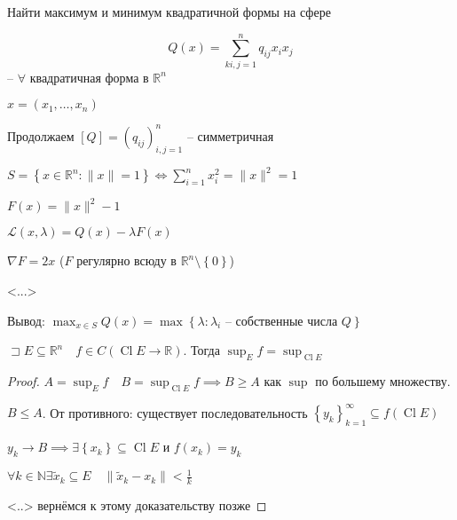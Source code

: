 \documentclass{book}
\newcommand\N{\ensuremath{\mathbb{N}}}
\newcommand\R{\ensuremath{\mathbb{R}}}
\newcommand{\tl}[1]{\widetilde{#1}}
\theoremstyle{definition}
\DeclareMathOperator{\Cl}{Cl}
\begin{document}
\begin{problem}
    Найти максимум и минимум квадратичной формы на сфере

    \[Q(x) = \sum_{ki,j=1}^{n} q_{ij}x_ix_j\] -- $\forall $ квадратичная форма в $\R^n$

    $x = \left( x_1, \ldots, x_{n}  \right) $

    Продолжаем $[Q] = \left( q_{ij} \right) ^n_{i,j=1}$ -- симметричная

    $S = \left\{ x\in \R^n:\|x\| = 1 \right\} \iff \sum_{i=1}^{n} x_i^2 = \|x\|^2 = 1 $ 

    $F(x) = \|x\|^2-1$

    $\mathcal L(x, \lambda) = Q(x) - \lambda F(x)$

    $\nabla F = 2x$ ($F$ регулярно всюду в  $\R^n\setminus \left\{ 0 \right\} $)

    <...>

    Вывод: $\max_{x\in S}Q(x) = \max \left\{ \lambda: \lambda_i \text{ -- собственные числа } Q \right\} $ 


\end{problem}
$\sqsupset E\subseteq \R^n \quad f\in C\left( \Cl E \to  \R \right)  $. Тогда $\sup_E f = \sup _{\Cl E}$
\begin{proof}
    $A = \sup _Ef\quad B = \sup_{\Cl E}f \implies B\geqslant A$ как $\sup$ по большему множеству.

    $B\leqslant A$. От противного: существует последовательность $\left\{ y_k \right\} _{k=1}^{\infty } \subseteq f\left( \Cl E \right) $ 

    $y_k\to B \implies \exists \left\{ x_k \right\} \subseteq \Cl E$ и $f(x_k) = y_k$

     $\forall k\in \N  \exists \tl x_k \subseteq E\quad \|\tl x_k - x_k\|<\frac{1}{k}$

     <..> вернёмся к этому доказательству позже
\end{proof}
\end{document}
